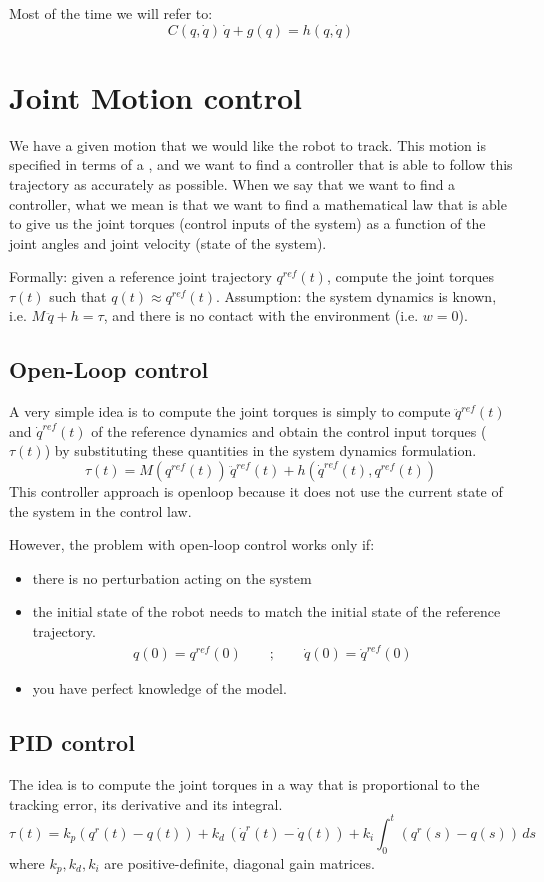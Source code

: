  Most of the time we will refer to:
 \[C(q, \dot{q})\,\dot{q} + g(q) = h(q, \dot{q})\]

\section{Joint Motion control}
 We have a given motion that we would like the robot to track. This motion is specified in terms of a , and we want to find a controller that is able to follow this trajectory as accurately as possible. When we say that we want to find a controller, what we mean is that we want to find a mathematical law that is able to give us the joint torques (control inputs of the system) as a function of the joint angles and joint velocity (state of the system).
 
Formally: given a reference joint trajectory $q^{ref}(t)$, compute the joint torques $\tau(t)$ such that $q(t) \approx q^{ref}(t)$.
Assumption: the system dynamics is known, i.e. $M\,\ddot{q} + h = \tau$, and there is no contact with the environment (i.e. $w = 0$).

\subsection{Open-Loop control}
A very simple idea is to compute the joint torques is simply to compute $\ddot{q}^{ref}(t)$ and $\dot{q}^{ref}(t)$ of the reference dynamics and obtain the control input torques ($\tau(t)$) by substituting these quantities in the system dynamics formulation.
\[\tau(t) = M(q^{ref}(t))\,\ddot{q}^{ref}(t) + h(\dot{q}^{ref}(t), q^{ref}(t))\]
This controller approach is openloop because it does not use the current state of the system in the control law.

However, the problem with open-loop control works only if:
\begin{itemize}
\item there is no perturbation acting on the system
\item the initial state of the robot needs to match the initial state of the reference trajectory. 
\begin{gather*}
q(0) = q^{ref}(0) \qquad;\qquad \dot{q}(0) = \dot{q}^{ref}(0)
\end{gather*}
\item you have perfect knowledge of the model.
\end{itemize}

\subsection{PID control}
The idea is to compute the joint torques in a way that is proportional to the tracking error, its derivative and its integral.
\[\tau(t) = k_p (q^r(t) - q(t)) + k_d\,(\dot{q}^r(t)-\dot{q}(t)) + k_i \int_0^t(q^r(s) - q(s))\,ds\]
where $k_p, k_d, k_i$ are positive-definite, diagonal gain matrices.

